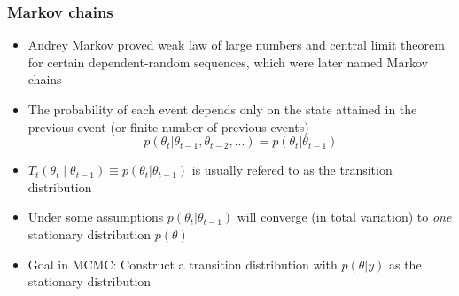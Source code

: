 \documentclass[10pt]{beamer}
\begin{document}
\begin{frame}

\frametitle{Markov chains}

  \begin{itemize}
  \item<1-> Andrey Markov proved weak law of large numbers and central
    limit theorem for certain dependent-random sequences, which were
    later named Markov chains
  \item<2-> The probability of each event depends only on the state
    attained in the previous event (or finite number of previous events)
    \[
    p(\theta_t|\theta_{t-1}, \theta_{t-2}, ...) = p(\theta_t|\theta_{t-1})
    \]
    \item<3-> $T_t(\theta_{t} \mid \theta_{t-1}) \equiv p(\theta_t|\theta_{t-1})$ is usually refered to as the {\color{uured} transition distribution}
    \item<4-> Under some assumptions $p(\theta_t|\theta_{t-1})$ will converge (in total variation) to \emph{one} {\color{uured} stationary distribution} $p(\theta)$
    \item<5-> Goal in MCMC: Construct a {\color{uured} transition distribution} with $p(\theta|y)$ as the {\color{uured} stationary distribution}
  \end{itemize}

\end{frame}




%
%
\end{document}
